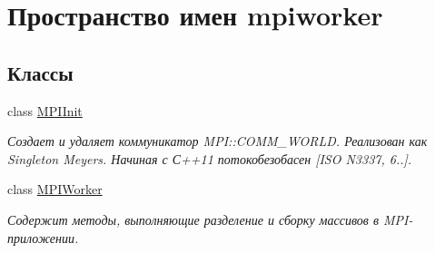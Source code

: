\hypertarget{namespacempiworker}{\section{Пространство имен mpiworker}
\label{namespacempiworker}
}
\subsection*{Классы}
\begin{DoxyCompactItemize}
\item 
class \hyperlink{classmpiworker_1_1MPIInit}{M\-P\-I\-Init}
\begin{DoxyCompactList}\small\item\em Создает и удаляет коммуникатор M\-P\-I\-::\-C\-O\-M\-M\-\_\-\-W\-O\-R\-L\-D. Реализован как Singleton Meyers. Начиная с С++11 потокобезобасен \mbox{[}I\-S\-O N3337, 6..\mbox{]}. \end{DoxyCompactList}\item 
class \hyperlink{classmpiworker_1_1MPIWorker}{M\-P\-I\-Worker}
\begin{DoxyCompactList}\small\item\em Содержит методы, выполняющие разделение и сборку массивов в M\-P\-I-\/приложении. \end{DoxyCompactList}\end{DoxyCompactItemize}
